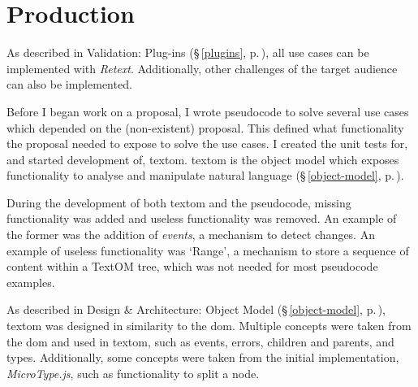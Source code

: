 
\begingroup
\let\clearpage\relax
\let\cleardoublepage\relax
\let\cleardoublepage\relax

\manualmark
{}

\chapter*{Production}\label{addendum-production}

As described in Validation: Plug-ins (§\,\ref{plugins},
  p.\,\pageref{plugins}), all use cases can be implemented with \emph{Retext}.
Additionally, other challenges of the target audience can also be
  implemented.

Before I began work on a proposal, I wrote pseudocode to solve several use
  cases which depended on the (non-existent) proposal.
This defined what functionality the proposal needed to expose to solve the use
  cases.
I created the unit tests for, and started development of, \gls{textom}.
\gls{textom} is the object model which exposes functionality to analyse and
  manipulate natural language (§\,\ref{object-model},
  p.\,\pageref{object-model}).

During the development of both \gls{textom} and the pseudocode, missing
  functionality was added and useless functionality was removed.
An example of the former was the addition of \emph{events}, a mechanism to
  detect changes.
An example of useless functionality was `Range', a mechanism to store a
  sequence of content within a TextOM tree, which was not needed for
  most pseudocode examples.

As described in Design \& Architecture: Object Model (§\,\ref{object-model},
  p.\,\pageref{object-model}), \gls{textom} was designed in similarity to the
  \gls{dom}.
Multiple concepts were taken from the \gls{dom} and used in \gls{textom},
  such as events, errors, children and parents, and types.
Additionally, some concepts were taken from the initial implementation,
  \emph{MicroType.js}, such as functionality to split a node.

